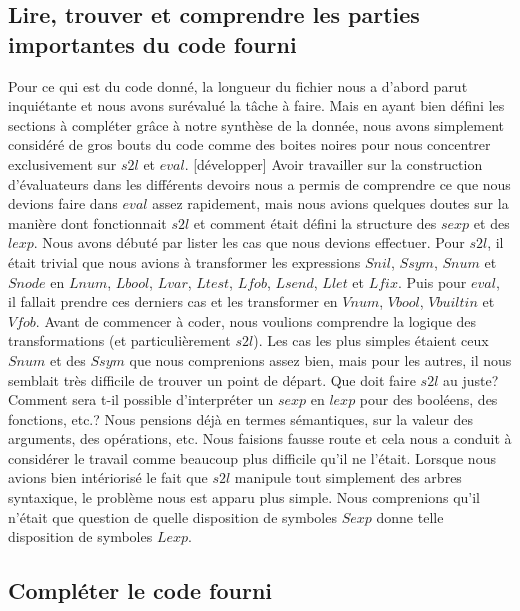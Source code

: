 \documentclass{article}
\begin{document}
	\subsection{Lire, trouver et comprendre les parties importantes du code fourni}

	Pour ce qui est du code donné, la longueur du fichier nous a d'abord parut inquiétante
	et nous avons surévalué la tâche à faire. Mais en ayant bien défini les
	sections à compléter grâce à notre synthèse de la donnée, nous avons simplement
	considéré de gros bouts du code comme des boites noires pour nous concentrer exclusivement
	sur $s2l$ et $eval$. [développer] Avoir travailler sur la construction d'évaluateurs
	dans les différents devoirs nous a permis de comprendre ce que nous devions
	faire dans $eval$ assez rapidement, mais nous avions quelques doutes sur la manière
	dont fonctionnait $s2l$ et comment était défini la structure des $sexp$ et des
	$lexp$. Nous avons débuté par lister les cas que nous devions effectuer. Pour $s
	2l$, il était trivial que nous avions à transformer les expressions $Snil$, $Ss
	ym$, $Snum$ et $Snode$ en $Lnum$, $Lbool$, $Lvar$, $Ltest$, $Lfob$, $Lsend$,
	$Llet$ et $Lfix$. Puis pour $eval$, il fallait prendre ces derniers cas et les
	transformer en $Vnum$, $Vbool$, $Vbuiltin$ et $Vfob$. Avant de commencer à coder,
	nous voulions comprendre la logique des transformations (et particulièrement $s
	2l$). Les cas les plus simples étaient ceux $Snum$ et des $Ssym$ que nous comprenions
	assez bien, mais pour les autres, il nous semblait très difficile de trouver un
	point de départ. Que doit faire $s2l$ au juste? Comment sera t-il possible d'interpréter
	un $sexp$ en $lexp$ pour des booléens, des fonctions, etc.? Nous pensions déjà
	en termes sémantiques, sur la valeur des arguments, des opérations, etc. Nous faisions
	fausse route et cela nous a conduit à considérer le travail comme beaucoup plus
	difficile qu'il ne l'était. Lorsque nous avions bien intériorisé le fait que
	$s2l$ manipule tout simplement des arbres syntaxique, le problème nous est apparu
	plus simple. Nous comprenions qu'il n'était que question de quelle disposition
	de symboles $Sexp$ donne telle disposition de symboles $Lexp$.

	\subsection{Compléter le code fourni}
\end{document}
